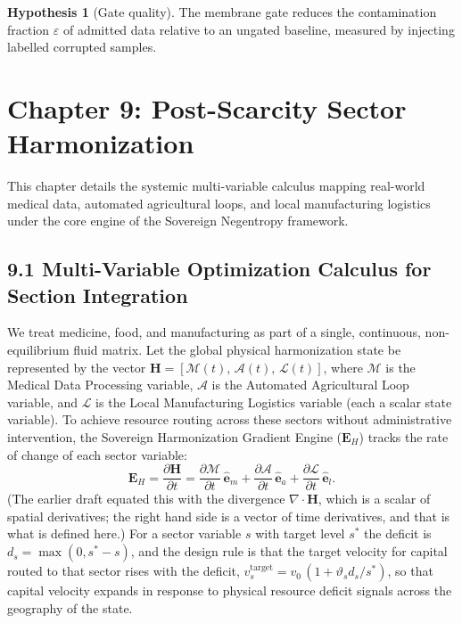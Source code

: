 \documentclass[11pt,a4paper]{article}
\theoremstyle{definition}
\newtheorem{hypothesis}{Hypothesis}
\theoremstyle{plain}
\theoremstyle{remark}
\begin{document}
\begin{hypothesis}[Gate quality]\label{hyp:gate}
The membrane gate reduces the contamination fraction $\varepsilon$ of admitted data relative to an ungated baseline, measured by injecting labelled corrupted samples.
\end{hypothesis}

\clearpage
\clearpage
\section*{Chapter 9: Post-Scarcity Sector Harmonization}
This chapter details the systemic multi-variable calculus mapping real-world medical data, automated agricultural loops, and local manufacturing logistics under the core engine of the Sovereign Negentropy framework.

\subsection*{9.1 Multi-Variable Optimization Calculus for Section Integration}
We treat medicine, food, and manufacturing as part of a single, continuous, non-equilibrium fluid matrix. Let the global physical harmonization state be represented by the vector $\mathbf H = [\mathcal M(t),\, \mathcal A(t),\, \mathcal L(t)]$, where $\mathcal M$ is the Medical Data Processing variable, $\mathcal A$ is the Automated Agricultural Loop variable, and $\mathcal L$ is the Local Manufacturing Logistics variable (each a scalar state variable). To achieve resource routing across these sectors without administrative intervention, the Sovereign Harmonization Gradient Engine ($\mathbf E_H$) tracks the rate of change of each sector variable:
\begin{equation}
\mathbf E_H = \frac{\partial \mathbf H}{\partial t}
= \frac{\partial \mathcal M}{\partial t}\, \hat{\mathbf e}_m
+ \frac{\partial \mathcal A}{\partial t}\, \hat{\mathbf e}_a
+ \frac{\partial \mathcal L}{\partial t}\, \hat{\mathbf e}_l .
\end{equation}
(The earlier draft equated this with the divergence $\nabla\!\cdot\mathbf H$, which is a scalar of spatial derivatives; the right hand side is a vector of time derivatives, and that is what is defined here.) For a sector variable $s$ with target level $s^{*}$ the deficit is $d_s = \max(0, s^{*} - s)$, and the design rule is that the target velocity for capital routed to that sector rises with the deficit, $v_s^{\mathrm{target}} = v_0\,(1 + \vartheta_s d_s / s^{*})$, so that capital velocity expands in response to physical resource deficit signals across the geography of the state.
\end{document}
